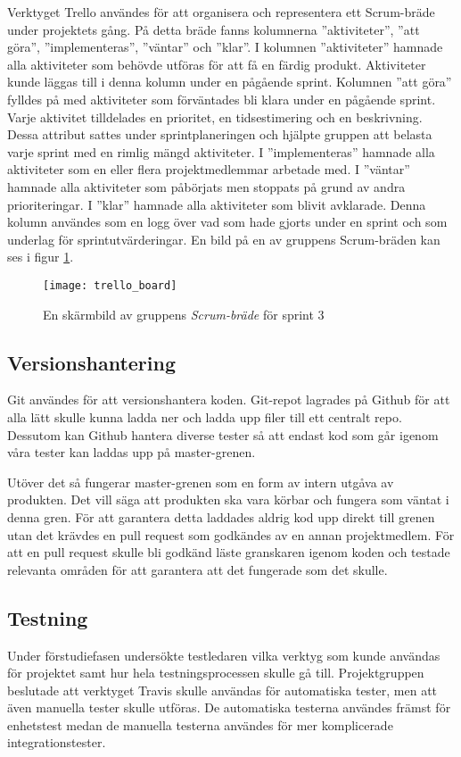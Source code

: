 Verktyget Trello användes för att organisera och representera ett Scrum-bräde under projektets gång. På detta bräde fanns kolumnerna ''aktiviteter'', ''att göra'', ''implementeras'', ''väntar'' och ''klar''. I kolumnen ''aktiviteter'' hamnade alla aktiviteter som behövde utföras för att få en färdig produkt. Aktiviteter kunde läggas till i denna kolumn under en pågående sprint. Kolumnen ''att göra'' fylldes på med aktiviteter som förväntades bli klara under en pågående sprint. Varje aktivitet tilldelades en prioritet, en tidsestimering och en beskrivning. Dessa attribut sattes under sprintplaneringen och hjälpte gruppen att belasta varje sprint med en rimlig mängd aktiviteter. I ''implementeras'' hamnade alla aktiviteter som en eller flera projektmedlemmar arbetade med. I ''väntar'' hamnade alla aktiviteter som påbörjats men stoppats på grund av andra prioriteringar. I ''klar'' hamnade alla aktiviteter som blivit avklarade. Denna kolumn användes som en logg över vad som hade gjorts under en sprint och som underlag för sprintutvärderingar. En bild på en av gruppens Scrum-bräden kan ses i figur \ref{fig:trello_board}.

\begin{figure}[h]
    \centering
    \texttt{[image: trello\_board]}
    \caption{En skärmbild av gruppens \textit{Scrum-bräde} för sprint 3}
    \label{fig:trello_board}
\end{figure}

\subsection{Versionshantering}
Git användes för att versionshantera koden. Git-repot lagrades på Github för att alla lätt skulle kunna ladda ner och ladda upp filer till ett centralt repo. Dessutom kan Github hantera diverse tester så att endast kod som går igenom våra tester kan laddas upp på master-grenen.

Utöver det så fungerar master-grenen som en form av intern utgåva av produkten. Det vill säga att produkten ska vara körbar och fungera som väntat i denna gren. För att garantera detta laddades aldrig kod upp direkt till grenen utan det krävdes en pull request som godkändes av en annan projektmedlem. För att en pull request skulle bli godkänd läste granskaren igenom koden och testade relevanta områden för att garantera att det fungerade som det skulle.

\subsection{Testning}
Under förstudiefasen undersökte testledaren vilka verktyg som kunde användas för projektet samt hur hela testningsprocessen skulle gå till. Projektgruppen beslutade att verktyget Travis skulle användas för automatiska tester, men att även manuella tester skulle utföras. De automatiska testerna användes främst för enhetstest medan de manuella testerna användes för mer komplicerade integrationstester.

